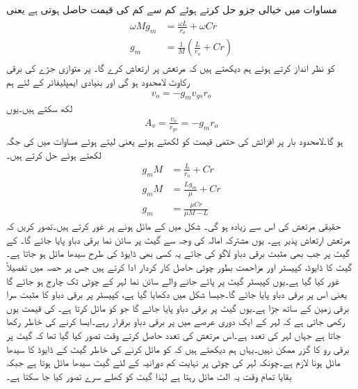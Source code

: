 مساوات  میں خیالی جزو حل کرتے ہوئے کم سے کم  کی قیمت حاصل ہوتی ہے یعنی
\begin{gather}
\begin{aligned}\label{مساوات_مرتعش_ہمسر_حقیقی_اجزاء}
\omega M g_m &= \frac{\omega L}{r_o}+\omega C r\\
g_m&=\frac{1}{M} \left(\frac{L}{r_o}+Cr \right )
\end{aligned}
\end{gather}
 کو نظر انداز کرتے ہوئے ہم دیکھتے ہیں کہ مرتعش  پر ارتعاش کرے گا۔ پر متوازی جڑے  کی برقی رکاوٹ لامحدود ہو گی اور بنیادی ایمپلیفائر کے لئے ہم
\begin{align*}
v_o=-g_m v_{gs} r_o
\end{align*}
لکھ سکتے ہیں۔یوں 
\begin{align*}
A_v=\frac{v_o}{v_{gs}}=-g_m r_o
\end{align*}
ہو گا۔لامحدود بار پر افزائش کی حتمی قیمت کو  لکھتے ہوئے یعنی  لیتے ہوئے مساوات  میں  کی جگہ  لکھتے ہوئے حل کرتے ہیں۔
\begin{align*}
g_m M&= \frac{L}{r_o}+Cr \\
g_m M&=\frac{L g_m}{\mu}+Cr\\
g_m&=\frac{\mu C r}{\mu M-L}
\end{align*}
حقیقی مرتعش کی  اس سے زیادہ ہو گی۔
%
شکل  میں  کے مائل ہونے پر غور کرتے ہیں۔تصور کریں کہ  مرتعش ارتعاش پذیر ہے۔ یوں مشترکہ امالہ کی وجہ سے  گیٹ پر سائن نما برقی دباو  پایا جائے گا۔ کے گیٹ پر جب بھی مثبت برقی دباو لاگو کی جائے یہ کسی بھی ڈایوڈ کی طرح سیدھا مائل ہو جاتا ہے۔گیٹ کا ڈایوڈ، کپیسٹر  اور مزاحمت  بطور چوٹی حاصل کار کردار ادا کرتے ہیں جس پر حصہ  میں تفصیلاً غور کیا گیا ہے۔یوں کپیسٹر  گیٹ پر پائے جانے والے سائن نما لہر کے چوٹی تک چارج ہو جائے گا یعنی اس پر  برقی دباو پایا جائے گا۔جیسا شکل میں دکھایا گیا ہے، کپیسٹر پر برقی دباو کا مثبت سرا برقی زمین کے ساتھ جڑا ہے۔یوں گیٹ پر  برقی دباو پایا جائے گا جو  کو مائل کرتا ہے۔ کی قیمت یوں رکھی جاتی ہے کہ  لہر کے ایک دوری عرصے میں  پر برقی دباو برقرار رہے۔ایسا کرنے کی خاطر   رکھا جاتا ہے جہاں  لہر کی تعدد ہے۔اس مرتعش کی تعدد حاصل کرتے وقت تصور کیا گیا تھا کہ گیٹ پر برقی رو کا گزر ممکن نہیں۔یہاں ہم دیکھتے ہیں کہ  کو مائل کرنے کی خاطر گیٹ کے ڈایوڈ کا سیدھا مائل ہونا لازم ہے۔چونکہ لہر کی چوٹی پر نہایت کم دورانیہ کے لئے گیٹ سیدھا مائل ہوتا ہے جبکہ بقایا تمام وقت یہ الٹ مائل رہتا ہے لہٰذا گیٹ کو کھلے سرے تصور کیا جا سکتا ہے۔


